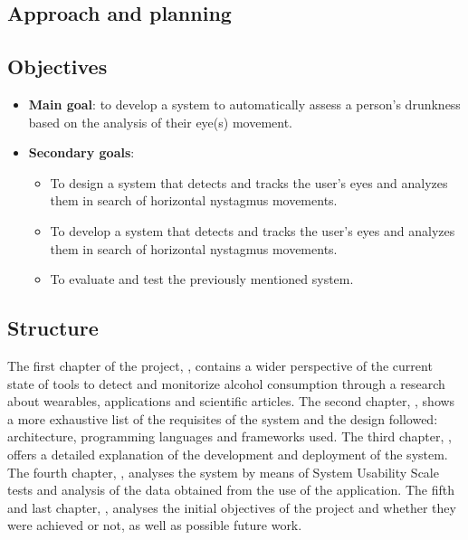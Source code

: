   \subsection{Approach and planning}


  \subsection{Objectives}
  \begin{itemize}
    \item \textbf{Main goal}: to develop a system to automatically assess a person's drunkness based on the analysis of their eye(s) movement.
    \item \textbf{Secondary goals}:
      \begin{itemize}
        \item To design a system that detects and tracks the user's eyes and analyzes them in search of horizontal nystagmus movements.
        \item To develop a system that detects and tracks the user's eyes and analyzes them in search of horizontal nystagmus movements.
        \item To evaluate and test the previously mentioned system.
      \end{itemize}
  \end{itemize}

  \subsection{Structure}

The first chapter of the project, \textit{}, contains a wider perspective of the current state of tools to detect and monitorize alcohol consumption through a research about wearables, applications and scientific articles. The second chapter, \textit{}, shows a more exhaustive list of the requisites of the system and the design followed: architecture, programming languages and frameworks used. The third chapter, \textit{}, offers a detailed explanation of the development and deployment of the system. The fourth chapter, \textit{}, analyses the system by means of System Usability Scale tests \cite{sus} and analysis of the data obtained from the use of the application. The fifth and last chapter, \textit{}, analyses the initial objectives of the project and whether they were achieved or not, as well as possible future work.
